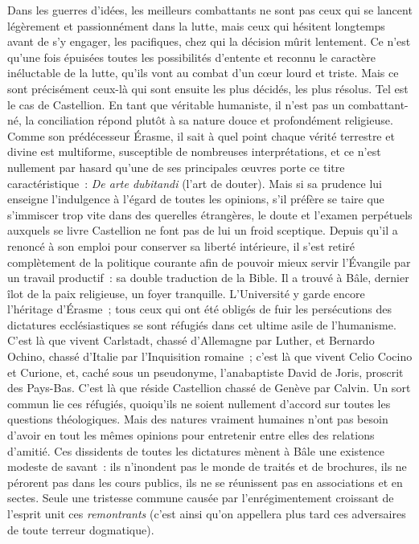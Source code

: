 \documentclass[french,twoside]{book} %
\newcommand{\astermono}{\medskip\centerline{\color{rubric}\large\selectfont{\syms ✻}}\medskip\par}%
\begin{document}
\astermono

\noindent Dans les guerres d’idées, les meilleurs combattants ne sont pas ceux qui se lancent légèrement et passionnément dans la lutte, mais ceux qui hésitent longtemps avant de s’y engager, les pacifiques, chez qui la décision mûrit lentement. Ce n’est qu’une fois épuisées toutes les possibilités d’entente et reconnu le caractère inéluctable de la lutte, qu’ils vont au combat d’un cœur lourd et triste. Mais ce sont précisément ceux-là qui sont ensuite les plus décidés, les plus résolus. Tel est le cas de Castellion. En tant que véritable humaniste, il n’est pas un combattant-né, la conciliation répond plutôt à sa nature douce et profondément religieuse. Comme son prédécesseur Érasme, il sait à quel point chaque vérité terrestre et divine est multiforme, susceptible de nombreuses interprétations, et ce n’est nullement par hasard qu’une de ses principales œuvres porte ce titre caractéristique : \emph{De arte dubitandi} (l’art de douter). Mais si sa prudence lui enseigne l’indulgence à l’égard de toutes les opinions, s’il préfère se taire que s’immiscer trop vite dans des querelles étrangères, le doute et l’examen perpétuels auxquels se livre Castellion ne font pas de lui un froid sceptique. Depuis qu’il a renoncé à son emploi pour conserver sa liberté intérieure, il s’est retiré complètement de la politique courante afin de pouvoir mieux servir l’Évangile par un travail productif : sa double traduction de la Bible. Il a trouvé à Bâle, dernier îlot de la paix religieuse, un foyer tranquille. L’Université y garde encore l’héritage d’Érasme ; tous ceux qui ont été obligés de fuir les persécutions des dictatures ecclésiastiques se sont réfugiés dans cet ultime asile de l’humanisme. C’est là que vivent Carlstadt, chassé d’Allemagne par Luther, et Bernardo Ochino, chassé d’Italie par l’Inquisition romaine ; c’est là que vivent Celio Cocino et Curione, et, caché sous un pseudonyme, l’anabaptiste David de Joris, proscrit des Pays-Bas. C’est là que réside Castellion chassé de Genève par Calvin. Un sort commun lie ces réfugiés, quoiqu’ils ne soient nullement d’accord sur toutes les questions théologiques. Mais des natures vraiment humaines n’ont pas besoin d’avoir en tout les mêmes opinions pour entretenir entre elles des relations d’amitié. Ces dissidents de toutes les dictatures mènent à Bâle une existence modeste de savant : ils n’inondent pas le monde de traités et de brochures, ils ne pérorent pas dans les cours publics, ils ne se réunissent pas en associations et en sectes. Seule une tristesse commune causée par l’enrégimentement croissant de l’esprit unit ces \emph{remontrants} (c’est ainsi qu’on appellera plus tard ces adversaires de toute terreur dogmatique).\par
\end{document}
